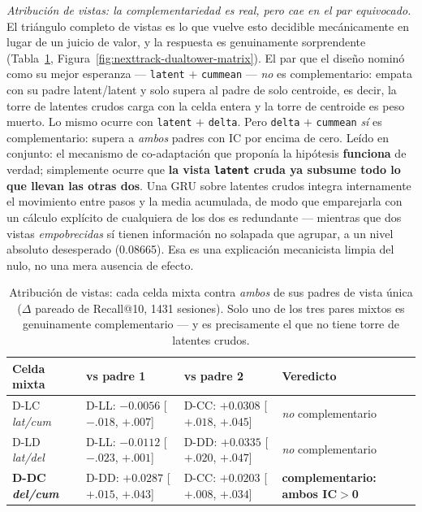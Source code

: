 \documentclass[11pt]{article}
\newcommand{\best}[1]{\textbf{#1}}
\begin{document}
\emph{Atribución de vistas: la complementariedad es real, pero cae en el par
equivocado.} El triángulo completo de vistas es lo que vuelve esto decidible
mecánicamente en lugar de un juicio de valor, y la respuesta es genuinamente
sorprendente (Tabla~\ref{tab:dualtower-views},
Figura~\ref{fig:nexttrack-dualtower-matrix}). El par que el diseño nominó como su
mejor esperanza --- \texttt{latent} $+$ \texttt{cummean} --- \emph{no} es
complementario: empata con su padre latent/latent y solo supera al padre de solo
centroide, es decir, la torre de latentes crudos carga con la celda entera y la
torre de centroide es peso muerto. Lo mismo ocurre con \texttt{latent} $+$
\texttt{delta}. Pero \texttt{delta} $+$ \texttt{cummean} \emph{sí} es
complementario: supera a \emph{ambos} padres con IC por encima de cero. Leído en
conjunto: el mecanismo de co-adaptación que proponía la hipótesis
\textbf{funciona} de verdad; simplemente ocurre que \textbf{la vista
\texttt{latent} cruda ya subsume todo lo que llevan las otras dos}. Una GRU sobre
latentes crudos integra internamente el movimiento entre pasos y la media
acumulada, de modo que emparejarla con un cálculo explícito de cualquiera de los
dos es redundante --- mientras que dos vistas \emph{empobrecidas} sí tienen
información no solapada que agrupar, a un nivel absoluto desesperado
(\num{0.08665}). Esa es una explicación mecanicista limpia del nulo, no una mera
ausencia de efecto.

\begin{table}[ht]
  \centering
  \caption{Atribución de vistas: cada celda mixta contra \emph{ambos} de sus
  padres de vista única ($\Delta$ pareado de Recall@10, \num{1431} sesiones).
  Solo uno de los tres pares mixtos es genuinamente complementario --- y es
  precisamente el que no tiene torre de latentes crudos.}
  \label{tab:dualtower-views}
  {\scriptsize\setlength{\tabcolsep}{3.4pt}\begin{tabular}{llll}
    \toprule
    Celda mixta & vs padre 1 & vs padre 2 & Veredicto \\
    \midrule
    D-LC \emph{lat/cum} & D-LL: $-0.0056$ [$-.018$, $+.007$] & D-CC: $+0.0308$ [$+.018$, $+.045$] & \emph{no} complementario \\
    D-LD \emph{lat/del} & D-LL: $-0.0112$ [$-.023$, $+.001$] & D-DD: $+0.0335$ [$+.020$, $+.047$] & \emph{no} complementario \\
    \best{D-DC \emph{del/cum}} & D-DD: $+0.0287$ [$+.015$, $+.043$] & D-CC: $+0.0203$ [$+.008$, $+.034$] & \best{complementario: ambos IC$>$0} \\
    \bottomrule
  \end{tabular}}
\end{table}
\end{document}
